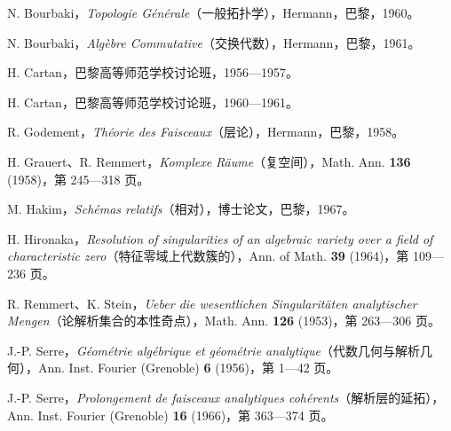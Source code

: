 \begin{enumerate}[label={[\arabic*]},leftmargin=2em]
\item N. Bourbaki，\textit{Topologie Générale}（一般拓扑学），Hermann，巴黎，1960。
\item N. Bourbaki，\textit{Algèbre Commutative}（交换代数），Hermann，巴黎，1961。
\item H. Cartan，巴黎高等师范学校讨论班，1956—1957。
\item H. Cartan，巴黎高等师范学校讨论班，1960—1961。
\item R. Godement，\textit{Théorie des Faisceaux}（层论），Hermann，巴黎，1958。
\item H. Grauert、R. Remmert，\textit{Komplexe Räume}（复空间），Math. Ann. \textbf{136} (1958)，第 245—318 页。
\item M. Hakim，\textit{Schémas relatifs}（相对），博士论文，巴黎，1967。
\item H. Hironaka，\textit{Resolution of singularities of an algebraic variety over a field of characteristic zero}（特征零域上代数簇的），Ann. of Math. \textbf{39} (1964)，第 109—236 页。
\item R. Remmert、K. Stein，\textit{Ueber die wesentlichen Singularitäten analytischer Mengen}（论解析集合的本性奇点），Math. Ann. \textbf{126} (1953)，第 263—306 页。
\item J.-P. Serre，\textit{Géométrie algébrique et géométrie analytique}（代数几何与解析几何），Ann. Inst. Fourier (Grenoble) \textbf{6} (1956)，第 1—42 页。
\item J.-P. Serre，\textit{Prolongement de faisceaux analytiques cohérents}（解析层的延拓），Ann. Inst. Fourier (Grenoble) \textbf{16} (1966)，第 363—374 页。
\end{enumerate}
